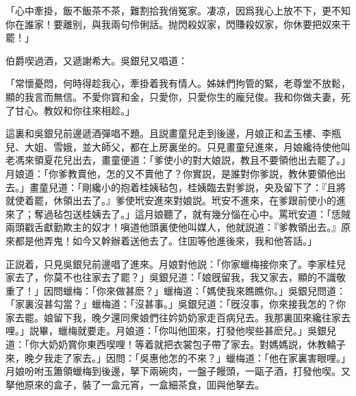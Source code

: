 \begin{myquote}
「心中牽掛，飯不飯茶不茶，難割拾我俏冤家。凄凉，因爲我心上放不下，更不知你在誰家！要離别，與我兩句伶俐話。抛閃殺奴家，閃賺殺奴家，你休要把奴來干罷！」
\end{myquote}

伯爵喫過酒，又遞謝希大。吳銀兒又唱道：

\begin{myquote}
「常懷憂悶，何時得趁我心，牽掛着我有情人。姊妹們拘管的緊，老尊堂不放鬆，顯的我言而無信。不愛你寳和金，只愛你，只愛你生的龐兒俊。我和你做夫妻，死了甘心。教奴和你往來相趁。」
\end{myquote}

這裏和吳銀兒前邊遞酒彈唱不題。且説畫童兒走到後邊，月娘正和孟玉樓、李瓶兒、大姐、雪娥，並大師父，都在上房裏坐的。只見畫童兒進來，月娘纔待使他叫老馮來領夏花兒出去，畫童便道：「爹使小的對大娘説，教且不要領他出去罷了。」月娘道：「你爹教賣他，怎的又不賣他了？你實説，是誰對你爹説，教休要領他出去。」畫童兒道：「剛纔小的抱着桂姨毡包，桂姨臨去對爹説，央及留下了：『且將就使着罷，休領出去了。』爹使玳安進來對娘説。玳安不進來，在爹跟前使小的進來了；奪過毡包送桂姨去了。」這月娘聽了，就有幾分惱在心中。罵玳安道：「恁賊兩頭戳舌獻勤欺主的奴才！嗔道他頭裏使他叫媒人，他就説道：『爹教領出去。』原來都是他弄鬼！如今又幹辦着送他去了。住囬等他進後來，我和他答話。」

正説着，只見吳銀兒前邊唱了進來。月娘對他説：「你家蠟梅接你來了。李家桂兒家去了，你莫不也往家去了罷？」吳銀兒道：「娘旣留我，我又家去，顯的不識敬重了！」因問蠟梅：「你來做甚麽？」蠟梅道：「媽使我來瞧瞧你。」吳銀兒問道：「家裏沒甚勾當？」蠟梅道：「沒甚事。」吳銀兒道：「旣沒事，你來接我怎的？你家去罷。娘留下我，晚夕還同衆娘們往妗奶奶家走百病兒去。我那裏囬來纔往家去哩。」説畢，蠟梅就要走。月娘道：「你叫他囬來，打發他喫些甚麽兒。」吳銀兒道：「你大奶奶賞你東西喫哩！等着就把衣裳包子帶了家去。對媽媽説，休教轎子來，晚夕我走了家去。」因問：「吳惠他怎的不來？」蠟梅道：「他在家裏害眼哩。」月娘吩咐玉簫領蠟梅到後邊，拏下兩碗肉，一盤子饅頭，一甌子酒，打發他喫。又拏他原來的盒子，裝了一盒元宵，一盒細茶食，囬與他拏去。

